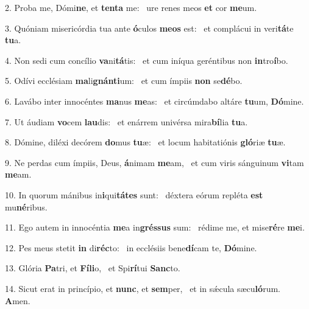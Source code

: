 2. Proba me, Dómi\textbf{ne}, et \textbf{ten}\textbf{ta} me: \ast\  ure renes meos \textbf{et} cor \textbf{me}um.\

3. Quóniam misericórdia tua ante \textbf{ó}culos \textbf{me}\textbf{os} est: \ast\  et complácui in veri\textbf{tá}te \textbf{tu}a.\

4. Non sedi cum concílio \textbf{va}ni\textbf{tá}tis: \ast\  et cum iníqua geréntibus non \textbf{in}tro\textbf{í}bo.\

5. Odívi ecclésiam \textbf{ma}li\textbf{gnán}\textbf{ti}um: \ast\  et cum ímpiis \textbf{non} se\textbf{dé}bo.\

6. Lavábo inter innocéntes \textbf{ma}nus \textbf{me}as: \ast\  et circúmdabo altáre \textbf{tu}um, \textbf{Dó}mine.\

7. Ut áudiam \textbf{vo}cem \textbf{lau}dis: \ast\  et enárrem univérsa mira\textbf{bí}lia \textbf{tu}a.\

8. Dómine, diléxi decórem \textbf{do}mus \textbf{tu}æ: \ast\  et locum habitatiónis \textbf{gló}riæ \textbf{tu}æ.\

9. Ne perdas cum ímpiis, Deus, \textbf{á}nimam \textbf{me}am, \ast\  et cum viris sánguinum \textbf{vi}tam \textbf{me}am.\

10. In quorum mánibus in\textbf{i}qui\textbf{tá}\textbf{tes} sunt: \ast\  déxtera eórum repléta \textbf{est} mu\textbf{né}ribus.\

11. Ego autem in innocéntia \textbf{me}a in\textbf{grés}\textbf{sus} sum: \ast\  rédime me, et mise\textbf{ré}re \textbf{me}i.\

12. Pes meus stetit \textbf{in} di\textbf{réc}to: \ast\  in ecclésiis bene\textbf{dí}cam te, \textbf{Dó}mine.\

13. Glória \textbf{Pa}tri, et \textbf{Fí}\textbf{li}o, \ast\  et Spi\textbf{rí}tui \textbf{Sanc}to.\

14. Sicut erat in princípio, et \textbf{nunc}, et \textbf{sem}per, \ast\  et in sǽcula sæcu\textbf{ló}rum. \textbf{A}men.\

